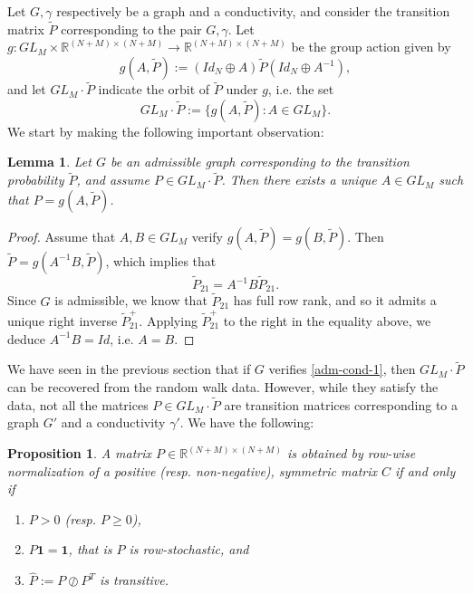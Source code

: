 \documentclass[a4paper,11pt,oneside]{amsart}
\newtheorem{lemma}[theorem]{Lemma}
\newtheorem{proposition}[theorem]{Proposition}
\newcommand{\R}{{\mathbb R}}
\begin{document}
Let $G,\gamma$ respectively be a graph and a conductivity, and consider the transition matrix $\tilde P$ corresponding to the pair $G,\gamma$. Let $g: GL_M\times \R^{(N+M)\times (N+M)}\rightarrow \R^{(N+M)\times (N+M)}$ be the group action given by
$$ g(A,\tilde P):= (Id_N\oplus A) \tilde P (Id_N\oplus A^{-1} ), $$
and let $GL_M\cdot \tilde P$ indicate the orbit of $\tilde P$ under $g$, i.e. the set
$$ GL_M\cdot \tilde P := \{ g(A,\tilde P) : A \in GL_M \} .$$
We start by making the following important observation:

\begin{lemma}\label{lem:unique}
    Let $G$ be an admissible graph corresponding to the transition probability $\tilde P$, and assume $P\in GL_M\cdot \tilde P$. Then there exists a unique $A\in GL_M$ such that $P=g(A,\tilde P)$.
\end{lemma}

\begin{proof}
    Assume that $A,B\in GL_M$ verify $g(A,\tilde P) = g(B,\tilde P)$. Then $\tilde P = g(A^{-1}B, \tilde P)$, which implies that
    $$ \tilde P_{21} = A^{-1}B\tilde P_{21}.$$
    Since $G$ is admissible, we know that $\tilde P_{21}$ has full row rank, and so it admits a unique right inverse $\tilde P_{21}^+$. Applying $\tilde P_{21}^+$ to the right in the equality above, we deduce $A^{-1}B = Id$, i.e. $A=B$.
\end{proof}

We have seen in the previous section that if $G$ verifies \ref{adm-cond-1}, then $GL_M\cdot \tilde P$ can be recovered from the random walk data. However, while they satisfy the data, not all the matrices $P\in GL_M\cdot \tilde P$ are transition matrices corresponding to a graph $G'$ and a conductivity $\gamma'$. We have the following:
\begin{proposition}\label{lem:3-cond}
    A matrix $P\in \R^{(N+M)\times (N+M)}$ is obtained by row-wise normalization of a positive (resp. non-negative), symmetric matrix $C$ if and only if
    \begin{enumerate}[label=(P\arabic*)]
    \item \label{cond-p1} $P> 0$ (resp. $P\geq 0$),
    \item \label{cond-p2} $P\mathbf 1 = \mathbf 1$, that is $P$ is row-stochastic, and
    \item \label{cond-p3} $\hat P := P\oslash P^T$ is transitive.
\end{enumerate}
\end{proposition}
\end{document}
